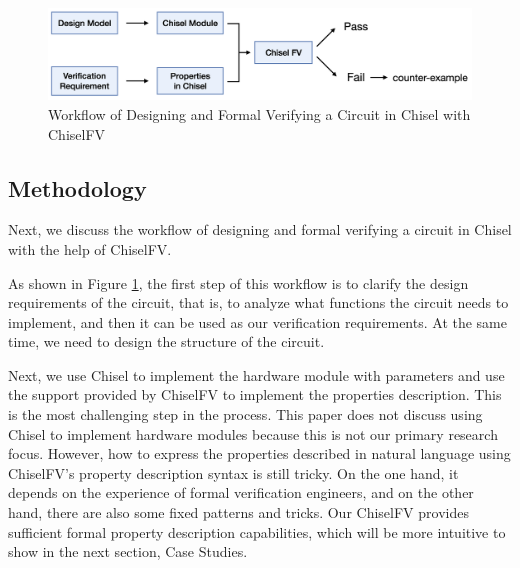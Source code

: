\documentclass[conference]{IEEEtran}
\theoremstyle{definition}
\begin{document}
\begin{figure}[!htbp]
    \begin{center}
    \includegraphics[width=0.8\linewidth]{pics/workflow.png}
    \caption{Workflow of Designing and Formal Verifying a Circuit in Chisel with ChiselFV}
    \label{fig: workflow}
    \end{center}
\end{figure}

\subsection{Methodology}

Next, we discuss the workflow of designing and formal verifying a circuit in Chisel with the help of ChiselFV.

As shown in Figure \ref{fig: workflow}, the first step of this workflow is to clarify the design requirements of the circuit, that is, to analyze what functions the circuit needs to implement, and then it can be used as our verification requirements. At the same time, we need to design the structure of the circuit.

Next, we use Chisel to implement the hardware module with parameters and use the support provided by ChiselFV to implement the properties description. This is the most challenging step in the process. This paper does not discuss using Chisel to implement hardware modules because this is not our primary research focus. However, how to express the properties described in natural language using ChiselFV's property description syntax is still tricky. On the one hand, it depends on the experience of formal verification engineers, and on the other hand, there are also some fixed patterns and tricks. Our ChiselFV provides sufficient formal property description capabilities, which will be more intuitive to show in the next section, Case Studies.
\end{document}
